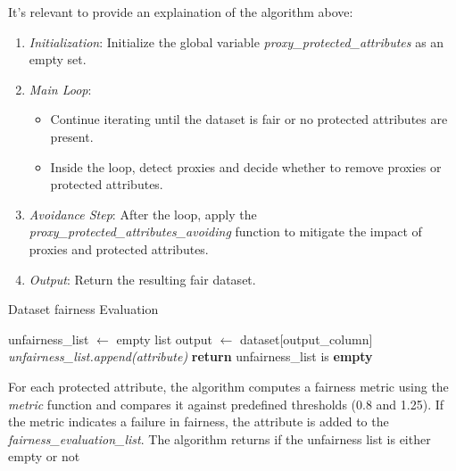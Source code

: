 \documentclass[12pt,a4paper,openright,twoside]{book}
\begin{document}
It's relevant to provide an explaination of the algorithm above:

\begin{enumerate}

    \item \emph{Initialization}: Initialize the global variable \textit{proxy\_protected\_attributes} as an empty set.

    \item \emph{Main Loop}:

        \begin{itemize}

            \item Continue iterating until the dataset is fair or no protected attributes are present.

            \item Inside the loop, detect proxies and decide whether to remove proxies or protected attributes.

        \end{itemize}

    \item \emph{Avoidance Step}: After the loop, apply the \textit{proxy\_protected\_attributes\_avoiding} function to mitigate the impact of proxies and protected attributes.
    
    \item \emph{Output}: Return the resulting fair dataset.

\end{enumerate}

\begin{algorithm}[H]
    \caption{Dataset fairness Evaluation}
    \label{alg:fairness_evaluation}
    \begin{algorithmic}[1]
        \State unfairness\_list $\gets$ empty list\;
        \State output $\gets$ dataset[output\_column]\;
                \State \textit{unfairness\_list.append(attribute)}\;
            \EndIf
        \EndFor
        \State \textbf{return} unfairness\_list is \textbf{empty}
    \end{algorithmic}
\end{algorithm}

For each protected attribute, the algorithm computes a fairness metric using the \textit{metric} function and compares it against predefined thresholds (0.8 and 1.25). If the metric indicates a failure in fairness, the attribute is added to the \textit{fairness\_evaluation\_list}. The algorithm returns if the unfairness list is either empty or not
\end{document}
